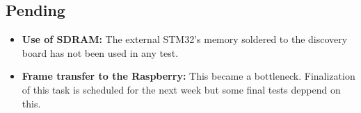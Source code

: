 \subsection{Pending}

\begin{itemize}
	\item \textbf{Use of SDRAM:} The external STM32's memory soldered to the discovery board has not been used in any test.
	\item \textbf{Frame transfer to the Raspberry:} This became a bottleneck. Finalization of this task is scheduled for the next week but some final tests deppend on this.
\end{itemize}
